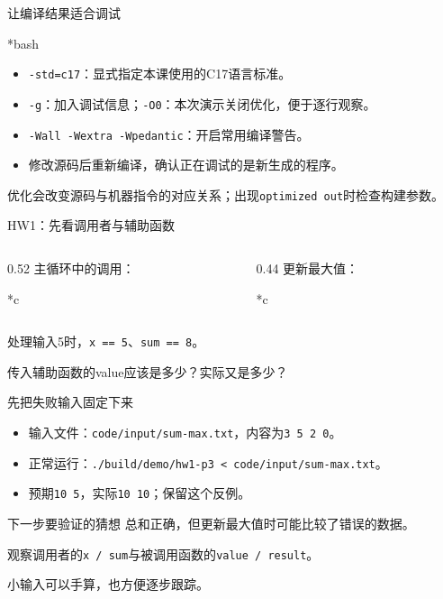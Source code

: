 \begin{frame}{让编译结果适合调试}
    \begin{Code}*{bash}
        
    \end{Code}
    \begin{itemize}
        \item \texttt{-std=c17}：显式指定本课使用的C17语言标准。
        \item \texttt{-g}：加入调试信息；\texttt{-O0}：本次演示关闭优化，便于逐行观察。
        \item \texttt{-Wall -Wextra -Wpedantic}：开启常用编译警告。
        \item 修改源码后\alert{重新编译}，确认正在调试的是新生成的程序。
    \end{itemize}
    \small 优化会改变源码与机器指令的对应关系；出现\texttt{optimized out}时检查构建参数。
\end{frame}

\begin{frame}{HW1：先看调用者与辅助函数}
    \begin{columns}[T]
        \begin{column}{0.52\textwidth}
            \alert{主循环中的调用：}
            \begin{Code}*{c}
                
            \end{Code}
        \end{column}
        \begin{column}{0.44\textwidth}
            \alert{更新最大值：}
            \begin{Code}*{c}
                
            \end{Code}
        \end{column}
    \end{columns}
    \medskip
    处理输入5时，\texttt{x == 5}、\texttt{sum == 8}。\par
    \alert{传入辅助函数的value应该是多少？实际又是多少？}
\end{frame}

\begin{frame}{先把失败输入固定下来}
    \begin{itemize}
        \item 输入文件：\texttt{code/input/sum-max.txt}，内容为\texttt{3 5 2 0}。
        \item 正常运行：\texttt{./build/demo/hw1-p3 < code/input/sum-max.txt}。
        \item 预期\texttt{10 5}，实际\texttt{10 10}；保留这个反例。
    \end{itemize}
    \medskip
    \begin{vspquotered}{下一步要验证的猜想}
        总和正确，但更新最大值时可能比较了错误的数据。\par
        观察调用者的\texttt{x / sum}与被调用函数的\texttt{value / result}。
    \end{vspquotered}
    \medskip
    \alert{小输入可以手算，也方便逐步跟踪。}
\end{frame}


